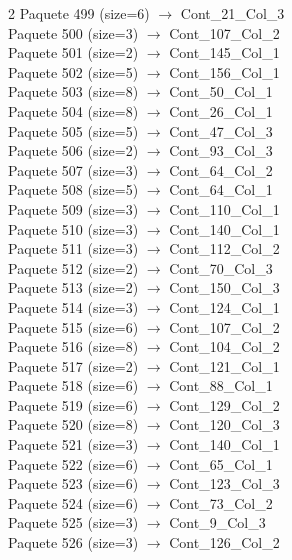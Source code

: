 \begin{multicols}{2}
Paquete 499 (size=6) $\rightarrow$ Cont\_21\_Col\_3\\
Paquete 500 (size=3) $\rightarrow$ Cont\_107\_Col\_2\\
Paquete 501 (size=2) $\rightarrow$ Cont\_145\_Col\_1\\
Paquete 502 (size=5) $\rightarrow$ Cont\_156\_Col\_1\\
Paquete 503 (size=8) $\rightarrow$ Cont\_50\_Col\_1\\
Paquete 504 (size=8) $\rightarrow$ Cont\_26\_Col\_1\\
Paquete 505 (size=5) $\rightarrow$ Cont\_47\_Col\_3\\
Paquete 506 (size=2) $\rightarrow$ Cont\_93\_Col\_3\\
Paquete 507 (size=3) $\rightarrow$ Cont\_64\_Col\_2\\
Paquete 508 (size=5) $\rightarrow$ Cont\_64\_Col\_1\\
Paquete 509 (size=3) $\rightarrow$ Cont\_110\_Col\_1\\
Paquete 510 (size=3) $\rightarrow$ Cont\_140\_Col\_1\\
Paquete 511 (size=3) $\rightarrow$ Cont\_112\_Col\_2\\
Paquete 512 (size=2) $\rightarrow$ Cont\_70\_Col\_3\\
Paquete 513 (size=2) $\rightarrow$ Cont\_150\_Col\_3\\
Paquete 514 (size=3) $\rightarrow$ Cont\_124\_Col\_1\\
Paquete 515 (size=6) $\rightarrow$ Cont\_107\_Col\_2\\
Paquete 516 (size=8) $\rightarrow$ Cont\_104\_Col\_2\\
Paquete 517 (size=2) $\rightarrow$ Cont\_121\_Col\_1\\
Paquete 518 (size=6) $\rightarrow$ Cont\_88\_Col\_1\\
Paquete 519 (size=6) $\rightarrow$ Cont\_129\_Col\_2\\
Paquete 520 (size=8) $\rightarrow$ Cont\_120\_Col\_3\\
Paquete 521 (size=3) $\rightarrow$ Cont\_140\_Col\_1\\
Paquete 522 (size=6) $\rightarrow$ Cont\_65\_Col\_1\\
Paquete 523 (size=6) $\rightarrow$ Cont\_123\_Col\_3\\
Paquete 524 (size=6) $\rightarrow$ Cont\_73\_Col\_2\\
Paquete 525 (size=3) $\rightarrow$ Cont\_9\_Col\_3\\
Paquete 526 (size=3) $\rightarrow$ Cont\_126\_Col\_2\\

\end{multicols}
